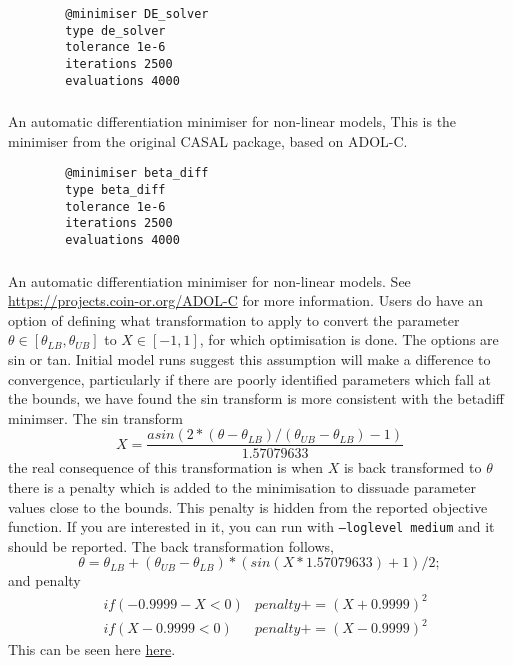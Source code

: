 {\small{\begin{verbatim}
		@minimiser DE_solver
		type de_solver
		tolerance 1e-6
		iterations 2500
		evaluations 4000
\end{verbatim}}}

\subsubsection{}\label{sec:Minimiser-BetaDiff}

An automatic differentiation minimiser for non-linear models, This is the minimiser from the original CASAL package, based on ADOL-C.

{\small{\begin{verbatim}
		@minimiser beta_diff
		type beta_diff
		tolerance 1e-6
		iterations 2500
		evaluations 4000
\end{verbatim}}}

\subsubsection{}\label{sec:Minimiser-ADOLC}

An automatic differentiation minimiser for non-linear models. See \url{https://projects.coin-or.org/ADOL-C} for more information. Users do have an option of defining what transformation to apply to convert the parameter \(\theta \in [\theta_{LB}, \theta_{UB}]\) to \(X \in [-1, 1]\), for which optimisation is done. The options are sin or tan. Initial model runs suggest this assumption will make a difference to convergence, particularly if there are poorly identified parameters which fall at the bounds, we have found the sin transform is more consistent with the betadiff minimser. The sin transform
\begin{equation}
	X = \frac{asin(2 * (\theta - \theta_{LB}) / (\theta_{UB} - \theta_{LB}) - 1)}{ 1.57079633}
\end{equation}
%
the real consequence of this transformation is when \(X\) is back transformed to \(\theta\) there is a penalty which is added to the minimisation to dissuade parameter values close to the bounds. This penalty is hidden from the reported objective function. If you are interested in it, you can run with \texttt{--loglevel medium} and it should be reported. The back transformation follows,
\begin{equation}
\theta = \theta_{LB} + (\theta_{UB} - \theta_{LB}) * (sin(X * 1.57079633) + 1) / 2;
\end{equation}
%
and penalty
\begin{align}
	&if(-0.9999 - X < 0) & penalty += (X + 0.9999)^2\\
	&if(X - 0.9999 < 0) & penalty += (X - 0.9999)^2
\end{align}
%
This can be seen here \href{https://github.com/NIWAFisheriesModelling/CASAL2/blob/1b1ed731537dc551674c911da3bf387273a97a92/CASAL2/source/Utilities/Math.h#L245}{here}.


